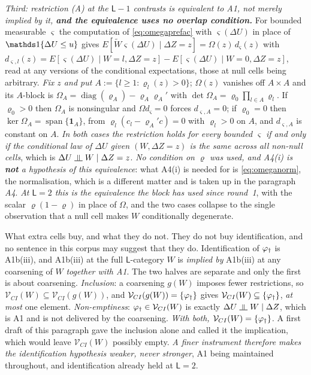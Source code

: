\emph{Third: restriction \textup{(A)} at the $\mathsf L-1$ contrasts is equivalent to A1, not merely
implied by it, \textbf{and the equivalence uses no overlap condition.}} For bounded measurable
$\varsigma$ the computation of \eqref{eq:omegaprefac} with
$\varsigma(\Delta U)$ in place of $\un\{\Delta U\le u\}$ gives
$E[\widetilde W\varsigma(\Delta U)\mid\Delta Z=z]=\Omega(z)\,d_\varsigma(z)$ with
$d_{\varsigma,l}(z)=E[\varsigma(\Delta U)\mid W=l,\Delta Z=z]-E[\varsigma(\Delta U)\mid W=0,\Delta Z=z]$,
read at any versions of the conditional expectations, those at null cells being arbitrary. \emph{Fix
$z$ and put $A:=\{l\ge1:\varrho_l(z)>0\}$}; $\Omega(z)$ vanishes off $A\times A$ and its $A$-block is
$\Omega_A=\operatorname{diag}(\varrho_A)-\varrho_A\varrho_A'$ with
$\det\Omega_A=\varrho_0\prod_{l\in A}\varrho_l$. If $\varrho_0>0$ then $\Omega_A$ is nonsingular and
$\Omega d_\varsigma=0$ forces $d_{\varsigma,A}=0$; if $\varrho_0=0$ then
$\ker\Omega_A=\operatorname{span}\{\mathbf 1_A\}$, from $\varrho_l(c_l-\varrho_A'c)=0$ with
$\varrho_l>0$ on $A$, and $d_{\varsigma,A}$ is constant on $A$. \emph{In both cases the restriction
holds for every bounded $\varsigma$ if and only if the conditional law of $\Delta U$ given
$(W,\Delta Z=z)$ is the same across all non-null cells}, which is $\Delta U\upmodels W\mid\Delta Z=z$.
\emph{No condition on $\varrho$ was used, and A4(i) is \textbf{not} a hypothesis of this equivalence}:
what A4(i) is needed for is \eqref{eq:omeganorm}, the normalisation, which is a different matter and is
taken up in the paragraph \emph{A4}. \emph{At $\mathsf L=2$ this is the equivalence the block has
used since round~1}, with the scalar $\varrho(1-\varrho)$ in place of $\Omega$, and the two cases
collapse to the single observation that a null cell makes $W$ conditionally degenerate.

What extra cells buy, and what they do not. They do not buy identification, and no sentence
in this corpus may suggest that they do. Identification of $\varphi_{\dagger}$ is A1b(iii), and A1b(iii) at the
full $\mathsf L$-category $W$ is \emph{implied by} A1b(iii) at any coarsening of $W$ \emph{together with
A1}. The two halves are separate and only the first is about coarsening. \emph{Inclusion}: a coarsening
$g(W)$ imposes fewer restrictions, so $\mathcal V_{CI}(W)\subseteq\mathcal V_{CI}(g(W))$, and
$\mathcal V_{CI}(g(W))=\{\varphi_{\dagger}\}$ gives $\mathcal V_{CI}(W)\subseteq\{\varphi_{\dagger}\}$, \emph{at most}
one element. \emph{Non-emptiness}: $\varphi_{\dagger}\in\mathcal V_{CI}(W)$ is exactly
$\Delta U\upmodels W\mid\Delta Z$, which is A1 and is not delivered by the coarsening. \emph{With both,
$\mathcal V_{CI}(W)=\{\varphi_{\dagger}\}$.} A first draft of this paragraph gave the inclusion alone and called
it the implication, which would leave $\mathcal V_{CI}(W)$ possibly empty. \emph{A finer
instrument therefore makes the identification hypothesis weaker, never stronger}, A1 being maintained
throughout, and identification
already held at $\mathsf L=2$.

